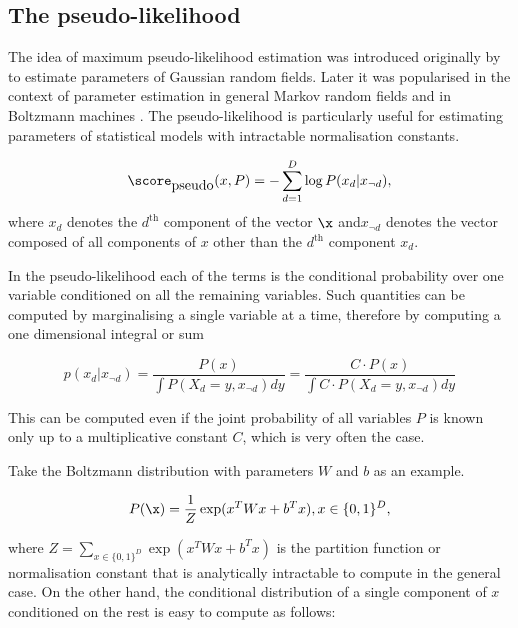 \subsection{The pseudo-likelihood\label{sec:pseudolikelihood}}

The idea of maximum pseudo-likelihood estimation was introduced originally by \citet{Besag1977} to estimate parameters of Gaussian random fields. Later it was popularised in the context of parameter estimation in general Markov random fields \citep{Comets1992} and in Boltzmann machines \citep{Hyvarinen2006}. The pseudo-likelihood is particularly useful for estimating parameters of statistical models with intractable normalisation constants.

\begin{equation}
	\score_{\mbox{pseudo}}(x,P) = - \sum_{d=1}^{D} \log P(x_d\vert x_{\neg d}),
\end{equation}
where $x_d$ denotes the $d^{\mbox{th}}$ component of the vector $\x$ and$x_{\neg d}$ denotes the vector composed of all components of $x$ other than the $d^{\mbox{th}}$ component $x_d$.

In the pseudo-likelihood each of the terms is the conditional probability over one variable conditioned on all the remaining variables. Such quantities can be computed by marginalising a single variable at a time, therefore by computing a one dimensional integral or sum

\begin{equation}
	p(x_d\vert x_{\neg d}) = \frac{P(x)}{\int P(X_d=y,x_{\neg d}) dy} = \frac{C \cdot P(x)}{\int C \cdot P(X_d=y,x_{\neg d}) dy}
\end{equation}

This can be computed even if the joint probability of all variables $P$ is known only up to a multiplicative constant $C$, which is very often the case.

Take the Boltzmann distribution with parameters $W$ and $b$ as an example. 

\begin{equation}
	P(\x) = \frac{1}{Z}\exp(x^{T}Wx + b^{T}x), x\in\{0,1\}^D,
\end{equation}

where $Z = \sum_{x\in\{0,1\}^D}\exp(x^{T}Wx + b^{T}x)$ is the partition function or normalisation constant that is analytically intractable to compute in the general case. On the other hand, the conditional distribution of a single component of $x$ conditioned on the rest is easy to compute as follows:

